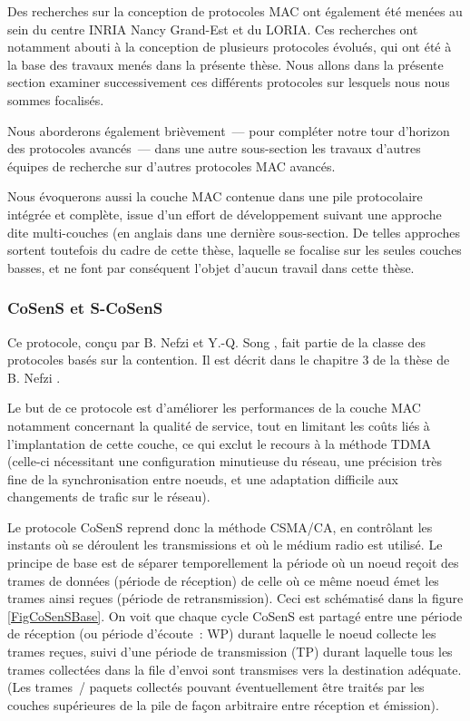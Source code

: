 Des recherches sur la conception de protocoles MAC ont également été menées
au sein du centre INRIA Nancy Grand-Est et du LORIA. Ces recherches ont
notamment abouti à la conception de plusieurs protocoles évolués, qui ont
été à la base des travaux menés dans la présente thèse. Nous allons dans
la présente section examiner successivement ces différents protocoles
sur lesquels nous nous sommes focalisés.

Nous aborderons également brièvement~--- pour compléter notre tour d'horizon
des protocoles avancés~--- dans une autre sous-section les travaux d'autres
équipes de recherche sur d'autres protocoles MAC avancés.

Nous évoquerons aussi la couche MAC contenue dans une pile protocolaire
intégrée et complète, issue d'un effort de développement suivant une approche
dite multi-couches (en anglais  dans une dernière
sous-section. De telles approches sortent toutefois du cadre de cette thèse,
laquelle se focalise sur les seules couches basses, et ne font par conséquent
l'objet d'aucun travail dans cette thèse.

\subsubsection{CoSenS et S-CoSenS}
\label{ParSCoSenS}

Ce protocole, conçu par B. Nefzi et Y.-Q. Song \cite{CosensConf}
\cite{CosensJournal}, fait partie de la classe des protocoles basés sur
la contention. Il est décrit dans le chapitre 3 de la thèse
de B. Nefzi \cite{TheseBNefzi}.

Le but de ce protocole est d'améliorer les performances de la couche
MAC notamment concernant la qualité de service, tout en limitant les coûts
liés à l'implantation de cette couche, ce qui exclut le recours à la
méthode TDMA (celle-ci nécessitant une configuration minutieuse
du réseau, une précision très fine de la synchronisation entre noeuds,
et une adaptation difficile aux changements de trafic sur le réseau).

Le protocole CoSenS reprend donc la méthode CSMA/CA, en contrôlant
les instants où se déroulent les transmissions et où le médium radio
est utilisé. Le principe de base est de séparer temporellement la période
où un noeud reçoit des trames de données (période de réception) de celle
où ce même noeud émet les trames ainsi reçues (période de retransmission).
Ceci est schématisé dans la figure \vref{FigCoSenSBase}. On voit que
chaque cycle CoSenS est partagé entre une période de réception (ou période
d'écoute~: WP) durant laquelle le noeud collecte les trames reçues,
suivi d'une période de transmission (TP) durant laquelle tous les trames
collectées dans la file d'envoi sont transmises vers la destination
adéquate. (Les trames~/ paquets collectés pouvant éventuellement être
traités par les couches supérieures de la pile de façon arbitraire
entre réception et émission).

